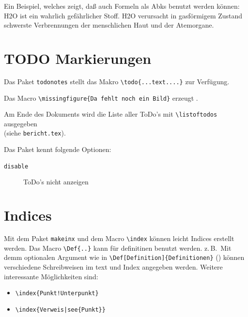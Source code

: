 Ein Beispiel, welches zeigt, daß auch Formeln als \acp{Abk} benutzt werden können:\\
\ac{H2O} ist ein wahrlich gefährlicher Stoff. \ac{H2O} verursacht in gasförmigem
Zustand schwerste Verbrennungen der menschlichen Haut und der Atemorgane.


\section{TODO Markierungen}

Das Paket \texttt{todonotes} stellt das Makro
\verb+\todo{...text....}+ zur Verfügung.

Das Macro \verb+\missingfigure{Da fehlt noch ein Bild}+ erzeugt
.


Am Ende des Dokuments wird die Liste aller ToDo's mit \verb+\listoftodos+ ausgegeben\\
(siehe \texttt{bericht.tex}).

\noindent
Das Paket kennt folgende Optionen:
\begin{description}
\item[\texttt{disable}] ToDo's nicht anzeigen
\end{description}


\section{Indices}

Mit dem Paket \verb+makeinx+ und dem Macro \verb+\index+ können  leicht Indices erstellt werden.
Das Macro \verb+\Def{..}+ kann für definitinen benutzt werden.
z.\,B.\, Mit demm optionalen Argument wie in  \verb+\Def[Definition]{Definitionen}+
() können verschiedene Schreibweisen im text und Index angegeben
werden.
Weitere interessante Möglichkeiten sind:
\begin{itemize}
\item \verb+\index{Punkt!Unterpunkt}+ 
\item \verb+\index{Verweis|see{Punkt}}+ 
\end{itemize}

